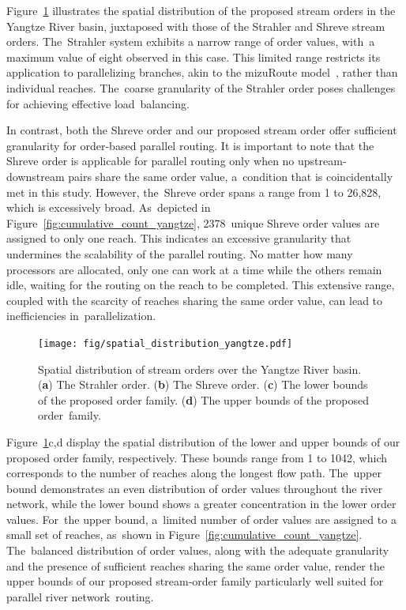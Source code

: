 \documentclass[water,article,accept,pdftex,moreauthors]{Definitions/mdpi}
\begin{document}
Figure~\ref{fig:spatial_distribution_yangtze} illustrates the spatial distribution of the proposed stream orders in the Yangtze River basin, juxtaposed with those of the Strahler and Shreve stream orders. The~Strahler system exhibits a narrow range of order values, with~a maximum value of eight observed in this case. This limited range restricts its application to parallelizing branches, akin to the mizuRoute model~\cite{mizukami2021JAMES}, rather than individual reaches. The~coarse granularity of the Strahler order poses challenges for achieving effective load~balancing.

In contrast, both the Shreve order and our proposed stream order offer sufficient granularity for order-based parallel routing. It is important to note that the Shreve order is applicable for parallel routing only when no upstream-downstream pairs share the same order value, a~condition that is coincidentally met in this study. However, the~Shreve order spans a range from 1 to 26,828, which is excessively broad. As~depicted in Figure~\ref{fig:cumulative_count_yangtze}, \mbox{2378 unique} Shreve order values are assigned to only one reach. This indicates an excessive granularity that undermines the scalability of the parallel routing. No matter how many processors are allocated, only one can work at a time while the others remain idle, waiting for the routing on the reach to be completed. This extensive range, coupled with the scarcity of reaches sharing the same order value, can lead to inefficiencies in~parallelization.

\begin{figure}[H]
    \texttt{[image: fig/spatial\_distribution\_yangtze.pdf]}
    \caption{Spatial distribution of stream orders over the Yangtze River basin. (\textbf{a}) The Strahler order. (\textbf{b}) The Shreve order. (\textbf{c}) The lower bounds of the proposed order family. (\textbf{d}) The upper bounds of the proposed order~family. \label{fig:spatial_distribution_yangtze}}
\end{figure}


Figure~\ref{fig:spatial_distribution_yangtze}c,d display the spatial distribution of the lower and upper bounds of our proposed order family, respectively. These bounds range from 1 to 1042, which corresponds to the number of reaches along the longest flow path. The~upper bound demonstrates an even distribution of order values throughout the river network, while the lower bound shows a greater concentration in the lower order values. For~the upper bound, a~limited number of order values are assigned to a small set of reaches, as~shown in Figure~\ref{fig:cumulative_count_yangtze}. The~balanced distribution of order values, along with the adequate granularity and the presence of sufficient reaches sharing the same order value, render the upper bounds of our proposed stream-order family particularly well suited for parallel river network~routing.
\end{document}
